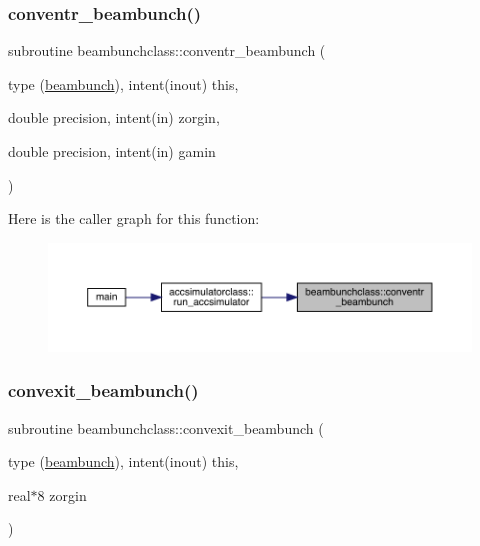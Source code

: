 \subsubsection{\texorpdfstring{conventr\_beambunch()}{conventr\_beambunch()}}
{\footnotesize\ttfamily subroutine beambunchclass\+::conventr\+\_\+beambunch (\begin{DoxyParamCaption}\item[{type (\mbox{\hyperlink{namespacebeambunchclass_structbeambunchclass_1_1beambunch}{beambunch}}), intent(inout)}]{this,  }\item[{double precision, intent(in)}]{zorgin,  }\item[{double precision, intent(in)}]{gamin }\end{DoxyParamCaption})}

Here is the caller graph for this function\+:\nopagebreak
\begin{figure}[H]
\begin{center}
\leavevmode
\includegraphics[width=350pt]{namespacebeambunchclass_a875b1de387c0e2e667bfa7a33bb70311_icgraph}
\end{center}
\end{figure}
\mbox{\label{namespacebeambunchclass_a4126361c8be17915e9c6c24697801f47}} 
\subsubsection{\texorpdfstring{convexit\_beambunch()}{convexit\_beambunch()}}
{\footnotesize\ttfamily subroutine beambunchclass\+::convexit\+\_\+beambunch (\begin{DoxyParamCaption}\item[{type (\mbox{\hyperlink{namespacebeambunchclass_structbeambunchclass_1_1beambunch}{beambunch}}), intent(inout)}]{this,  }\item[{real$\ast$8}]{zorgin }\end{DoxyParamCaption})}

